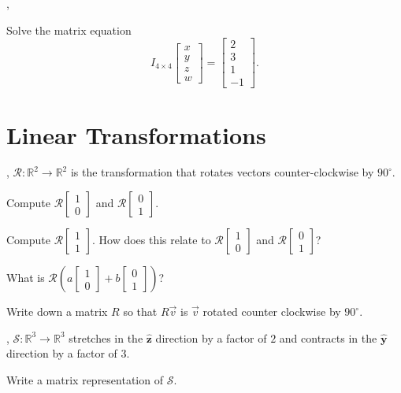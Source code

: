 \documentclass[letter]{article}
\newcommand{\yh}{{\hat {\mathbf y}}}
\newcommand{\zh}{{\hat {\mathbf z}}}
\newcommand{\R}{\mathbb{R}}
\newcommand{\mat}[1]{\begin{bmatrix}#1\end{bmatrix}}
\renewcommand{\emph}[1]{{\color{defcolor} \textbf{\textit{##1}}}}
\begin{document}
	\sep
	\vspace{-.8cm}
	\begin{Enum}
		\item Solve the matrix equation
		\[
			I_{4\times 4}\mat{x\\y\\z\\w} = \mat{2\\3\\1\\-1}.
		\]
	\end{Enum}


\newpage
\section*{Linear Transformations}

\vspace{-.5cm}
\sep
$\mathcal R:\R^2\to\R^2$ is the transformation that rotates vectors counter-clockwise 
by $90^\circ$.
\begin{Enum}
	\item Compute $\mathcal R\mat{1\\0}$ and $\mathcal R\mat{0\\1}$.
	\item Compute $\mathcal R\mat{1\\1}$.  How does this relate to
		$\mathcal R\mat{1\\0}$ and $\mathcal R\mat{0\\1}$?
	\item What is $\mathcal R\left(a\mat{1\\0}+b\mat{0\\1}\right)$?
	\item Write down a matrix $R$ so that $R\vec v$ is $\vec v$ rotated
		counter clockwise by $90^\circ$.
\end{Enum}

\vspace{-.5cm}
\sep
$\mathcal S:\R^3\to\R^3$ stretches in the $\zh$ direction  by a factor of $2$
and contracts in the $\yh$ direction by a factor of $3$.
\begin{Enum}
	\item Write a matrix representation of $\mathcal S$.
\end{Enum}

	\vspace{-.8cm}
\end{document}
